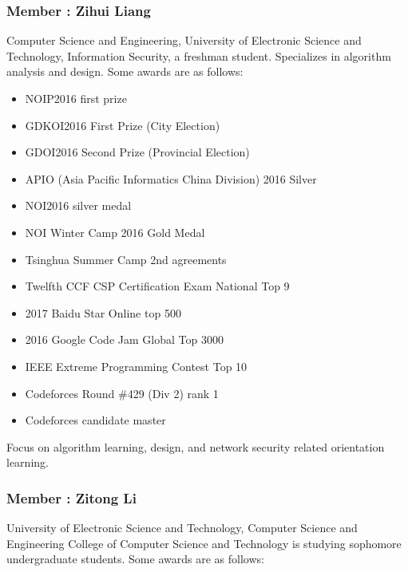 \documentclass{mcmthesis}
\begin{document}
\subsubsection*{\textbf{Member} : Zihui Liang}
\par Computer Science and Engineering, University of Electronic Science and Technology, Information Security, a freshman student. Specializes in algorithm analysis and design. Some awards are as follows:

\begin{itemize}
	\item NOIP2016 first prize
	\item GDKOI2016 First Prize (City Election)
	\item GDOI2016 Second Prize (Provincial Election)
	\item APIO (Asia Pacific Informatics China Division) 2016 Silver
	\item NOI2016 silver medal
	\item NOI Winter Camp 2016 Gold Medal
	\item Tsinghua Summer Camp 2nd agreements
	\item Twelfth CCF CSP Certification Exam National Top 9
	\item 2017 Baidu Star Online top 500
	\item 2016 Google Code Jam Global Top 3000
	\item IEEE Extreme Programming Contest Top 10
	\item Codeforces Round \#429 (Div 2) rank 1
	\item Codeforces candidate master
\end{itemize}

\par Focus on algorithm learning, design, and network security related orientation learning.

\subsubsection*{\textbf{Member} : Zitong Li}

\par University of Electronic Science and Technology, Computer Science and Engineering College of Computer Science and Technology is studying sophomore undergraduate students. Some awards are as follows:
\end{document}
